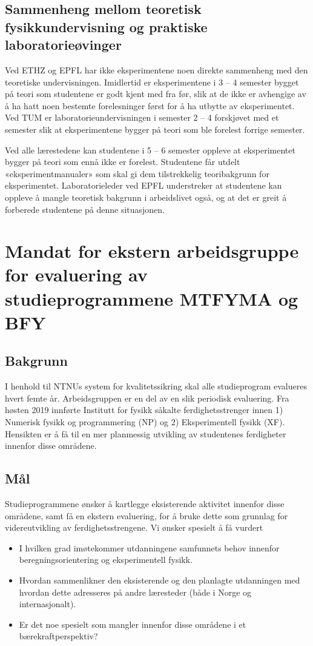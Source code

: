 \documentclass{article}
\begin{document}
\subsection{Sammenheng mellom teoretisk fysikkundervisning og praktiske laboratorieøvinger}

Ved ETHZ og EPFL har ikke eksperimentene noen direkte sammenheng med den teoretiske undervisningen. Imidlertid er eksperimentene i 3 – 4 semester bygget på teori som studentene er godt kjent med fra før, slik at de ikke er avhengige av å ha hatt noen bestemte forelesninger først for å ha utbytte av eksperimentet. Ved TUM er laboratorieundervisningen i semester 2 – 4 forskjøvet med et semester slik at eksperimentene bygger på teori som ble forelest forrige semester.

Ved alle lærestedene kan studentene i 5 – 6 semester oppleve at eksperimentet bygger på teori som ennå ikke er forelest. Studentene får utdelt «eksperimentmanualer» som skal gi dem tilstrekkelig teoribakgrunn for eksperimentet. Laboratorieleder ved EPFL understreker at studentene kan oppleve å mangle teoretisk bakgrunn i arbeidslivet også, og at det er greit å forberede studentene på denne situasjonen.


\section{Mandat for ekstern arbeidsgruppe for evaluering av studieprogrammene MTFYMA og BFY}
\subsection{Bakgrunn}
I henhold til NTNUs system for kvalitetssikring skal alle studieprogram evalueres hvert femte år. Arbeidsgruppen er en del av en slik periodisk evaluering. Fra høsten 2019 innførte Institutt for fysikk såkalte ferdighetsstrenger innen 1) Numerisk fysikk og programmering (NP) og 2) Eksperimentell fysikk (XF). Hensikten er å få til en mer planmessig utvikling av studentenes ferdigheter innenfor disse områdene. 

\subsection{Mål}
Studieprogrammene ønsker å kartlegge eksisterende aktivitet innenfor disse områdene, samt få en ekstern evaluering, for å bruke dette som grunnlag for videreutvikling av ferdighetsstrengene.
Vi ønsker spesielt å få vurdert
\begin{itemize}
  \item I hvilken grad imøtekommer utdanningene samfunnets behov innenfor beregningsorientering og eksperimentell fysikk.
  \item Hvordan sammenlikner den eksisterende og den planlagte utdanningen med hvordan dette adresseres på andre læresteder (både i Norge og internasjonalt).
  \item Er det noe spesielt som mangler innenfor disse områdene i et bærekraftperspektiv?
\end{itemize}
\end{document}

